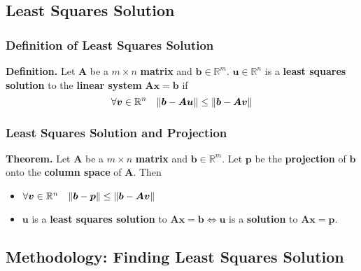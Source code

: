 \documentclass[../ma2001_notes.tex]{subfiles}
\begin{document}
\subsection{Least Squares Solution}
\subsubsection{Definition of Least Squares Solution}
\textbf{Definition.} Let \(\bm{A}\) be a \(m\times n\) \textbf{matrix} and \(\bm{b}\in\mathbb{R}^m\). \(\bm{u}\in\mathbb{R}^n\) is a \textbf{least squares solution} to the \textbf{linear system} \(\bm{Ax}=\bm{b}\) if
\[\forall\bm{v}\in\mathbb{R}^n\quad\lVert\bm{b}-\bm{Au}\rVert\leq\lVert\bm{b}-\bm{Av}\rVert\]

\subsubsection{Least Squares Solution and Projection}
\textbf{Theorem.} Let \(\bm{A}\) be a \(m\times n\) \textbf{matrix} and \(\bm{b}\in\mathbb{R}^m\). Let \(\bm{p}\) be the \textbf{projection} of \(\bm{b}\) onto the \textbf{column space} of \(\bm{A}\). Then
\begin{itemize}
	\item\(\forall\bm{v}\in\mathbb{R}^n\quad\lVert\bm{b}-\bm{p}\rVert\leq\lVert\bm{b}-\bm{Av}\rVert\)
	\item\(\bm{u}\) is a \textbf{least squares solution} to \(\bm{Ax}=\bm{b}\Leftrightarrow\bm{u}\) is a \textbf{solution} to \(\bm{Ax}=\bm{p}\).
\end{itemize}

\subsection{Methodology: Finding Least Squares Solution}
\end{document}
